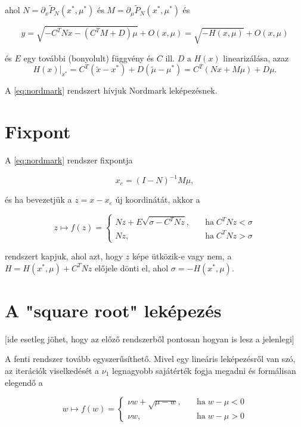 \noindent ahol $N=\partial_x \tilde{P}_N(x^*,\mu^*)$ és $M=\partial_\mu \tilde{P}_N(x^*,\mu^*)$ és 

\begin{equation}
y=\sqrt{-C^TNx-(C^T M+D)\mu}+O(x,\mu)=\sqrt{-H(x,\mu)}+O(x,\mu)
\end{equation}

\noindent és $E$ egy további (bonyolult) függvény és $C$ ill. $D$ a $H(x)$ linearizálása, azaz 
\begin{equation}
\left.H(x)\right|_{x^*}=C^T(\tilde{x}-x^*)+D(\tilde{\mu}-\mu^*)=C^T (Nx+M\mu)+D \mu.
\end{equation}

\noindent A \eqref{eq:nordmark} rendszert hívjuk Nordmark leképezésnek.

\section{Fixpont}

A \eqref{eq:nordmark} rendszer fixpontja

\begin{equation}
x_e=(I-N)^{-1}M \mu,
\end{equation}

\noindent és ha bevezetjük a $z=x-x_e$ új koordinátát, akkor a

\begin{equation}
z \mapsto f(z)=\begin{cases}
Nz+E\sqrt{\sigma-C^T N z}, \quad &\text{ha} \; C^T N z<\sigma\\
Nz, &\text{ha} \; C^T N z>\sigma
\end{cases}
\end{equation}

\noindent rendszert kapjuk, ahol azt, hogy $z$ képe ütközik-e vagy nem, a $H=H(x^*,\mu)+C^T N z$ előjele dönti el, ahol $\sigma=-H(x^*,\mu)$.

\section{A "square root" leképezés}

[ide esetleg jöhet, hogy az előző rendszerből pontosan hogyan is lesz a jelenlegi]

A fenti rendszer tovább egyszerűsíthető. Mivel egy lineáris leképezésről van szó, az iterációk viselkedését a $\nu_1$ legnagyobb sajátérték fogja megadni és formálisan elegendő a

\begin{equation}\label{eq:sr}
w \mapsto f(w)=\begin{cases}
\nu w+\sqrt{\mu-w}, \quad &\text{ha} \; w-\mu<0\\
\nu w, &\text{ha} \; w-\mu>0
\end{cases}
\end{equation}

